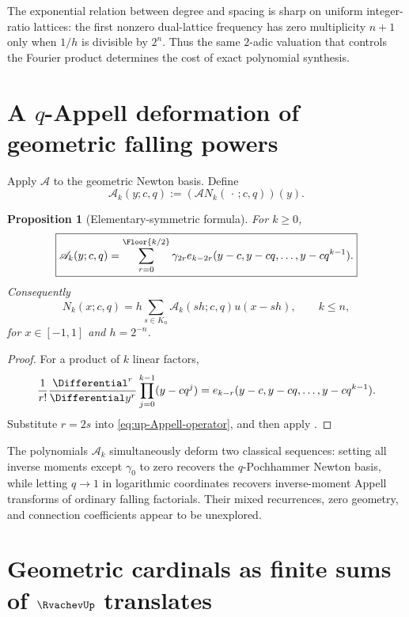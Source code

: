 \documentclass[11pt,oneside]{book}
\numberwithin{equation}{chapter}
\newtheorem{proposition}[theorem]{Proposition}
\theoremstyle{definition}
\theoremstyle{remark}
\newcommand{\App}{\mathcal A}
\begin{document}
The exponential relation between degree and spacing is sharp on uniform
integer-ratio lattices: the first nonzero dual-lattice frequency has zero
multiplicity $n+1$ only when $1/h$ is divisible by $2^n$.  Thus the same
$2$-adic valuation that controls the Fourier product determines the cost of
exact polynomial synthesis.

\section{A \texorpdfstring{$q$}{q}-Appell deformation of geometric falling powers}

Apply $\App$ to the geometric Newton basis.  Define
\begin{equation}
 \mathscr A_k(y;c,q):=(\App N_k(\,\cdot\,;c,q))(y).
 \label{eq:q-Appell-falling-definition}
\end{equation}

\begin{proposition}[Elementary-symmetric formula]
\label{prop:q-Appell-falling}
For $k\ge0$,
\begin{equation}
 \boxed{
 \mathscr A_k(y;c,q)
 =\sum_{r=0}^{\Floor{k/2}}\gamma_{2r}
 e_{k-2r}(y-c,y-cq,\ldots,y-cq^{k-1}).}
 \label{eq:q-Appell-falling}
\end{equation}
Consequently
\begin{equation}
 N_k(x;c,q)
 =h\sum_{s\in K_n}\mathscr A_k(sh;c,q)u(x-sh),
 \qquad k\le n,
 \label{eq:q-falling-up-synthesis}
\end{equation}
for $x\in[-1,1]$ and $h=2^{-n}$.
\end{proposition}

\begin{proof}
For a product of $k$ linear factors,
\[
 \frac1{r!}\frac{\Differential^r}{\Differential y^r}
 \prod_{j=0}^{k-1}(y-cq^j)
 =e_{k-r}(y-c,y-cq,\ldots,y-cq^{k-1}).
\]
Substitute $r=2s$ into \eqref{eq:up-Appell-operator}, and then apply
.
\end{proof}

The polynomials $\mathscr A_k$ simultaneously deform two classical
sequences: setting all inverse moments except $\gamma_0$ to zero recovers the
$q$-Pochhammer Newton basis, while letting $q\to1$ in logarithmic coordinates
recovers inverse-moment Appell transforms of ordinary falling factorials.
Their mixed recurrences, zero geometry, and connection coefficients appear
to be unexplored.

\section{Geometric cardinals as finite sums of \texorpdfstring{$\RvachevUp$}{up} translates}
\label{sec:geometric-cardinal-up}
\end{document}
